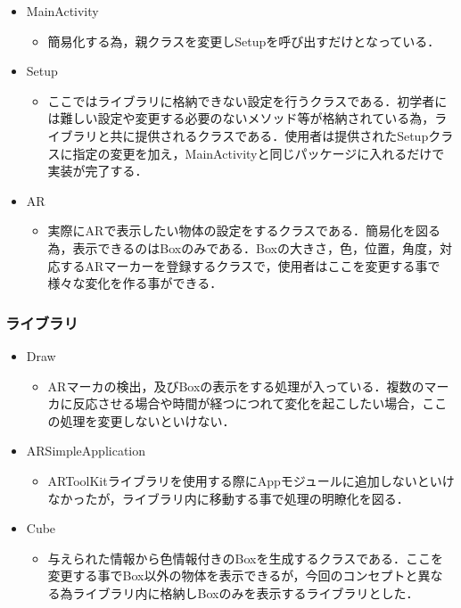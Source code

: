 \begin{itemize}
 \item MainActivity
       \begin{itemize}
	\item 簡易化する為，親クラスを変更しSetupを呼び出すだけとなっている．
       \end{itemize}
 \item Setup
       \begin{itemize}
	\item ここではライブラリに格納できない設定を行うクラスである．初学者には難しい設定や変更する必要のないメソッド等が格納されている為，ライブラリと共に提供されるクラスである．使用者は提供されたSetupクラスに指定の変更を加え，MainActivityと同じパッケージに入れるだけで実装が完了する．
       \end{itemize}
 \item AR
       \begin{itemize}
	\item 実際にARで表示したい物体の設定をするクラスである．簡易化を図る為，表示できるのはBoxのみである．Boxの大きさ，色，位置，角度，対応するARマーカーを登録するクラスで，使用者はここを変更する事で様々な変化を作る事ができる．
       \end{itemize}
\end{itemize}

\subsubsection{ライブラリ}

\begin{itemize}
 \item Draw
       \begin{itemize}
	\item ARマーカの検出，及びBoxの表示をする処理が入っている．複数のマーカに反応させる場合や時間が経つにつれて変化を起こしたい場合，ここの処理を変更しないといけない．
       \end{itemize}
 \item ARSimpleApplication
       \begin{itemize}
	\item ARToolKitライブラリを使用する際にAppモジュールに追加しないといけなかったが，ライブラリ内に移動する事で処理の明瞭化を図る．
       \end{itemize}
 \item Cube
       \begin{itemize}
	\item 与えられた情報から色情報付きのBoxを生成するクラスである．ここを変更する事でBox以外の物体を表示できるが，今回のコンセプトと異なる為ライブラリ内に格納しBoxのみを表示するライブラリとした．
       \end{itemize}
\end{itemize}

